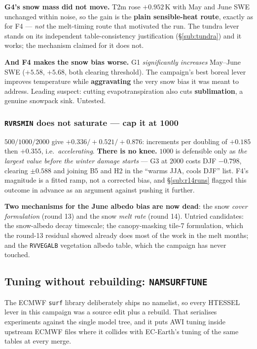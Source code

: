 \documentclass[10pt]{article}
\begin{document}
\noindent \textbf{G4's snow mass did not move.} T2m rose $+0.952$\,K with May and June SWE
unchanged within noise, so the gain is the \textbf{plain sensible-heat route}, exactly as for
F4 --- \emph{not} the melt-timing route that motivated the run. The tundra lever stands on its
independent table-consistency justification (\S\ref{sub:tundra}) and it works; the mechanism
claimed for it does not.

\noindent \textbf{And F4 makes the snow bias worse.} G1 \emph{significantly increases}
May--June SWE ($+5.58$, $+5.68$, both clearing threshold). The campaign's best boreal lever
improves temperature while \textbf{aggravating} the very snow bias it was meant to address.
Leading suspect: cutting evapotranspiration also cuts \textbf{sublimation}, a genuine
snowpack sink. Untested.

\subsubsection*{\texttt{RVRSMIN} does not saturate --- cap it at 1000}
$500/1000/2000$ give $+0.336/+0.521/+0.876$: increments per doubling of $+0.185$ then
$\mathbf{+0.355}$, i.e.\ \emph{accelerating}. \textbf{There is no knee.} $1000$ is defensible
only as \emph{the largest value before the winter damage starts} --- G3 at $2000$ costs
DJF $-0.798$, clearing $\pm0.588$ and joining B5 and H2 in the ``warms JJA, cools DJF'' list.
F4's magnitude is a fitted ramp, not a corrected bias, and \S\ref{sub:r14runs} flagged this
outcome in advance as an argument against pushing it further.

\noindent \textbf{Two mechanisms for the June albedo bias are now dead}: the snow
\emph{cover formulation} (round 13) and the snow \emph{melt rate} (round 14). Untried
candidates: the snow-albedo decay timescale; the canopy-masking tile-7 formulation, which the
round-13 residual showed already does most of the work in the melt months; and the
\texttt{RVVEGALB} vegetation albedo table, which the campaign has never touched.

\subsection{Tuning without rebuilding: \texttt{NAMSURFTUNE}}\label{sub:nmltune}
The ECMWF \texttt{surf} library deliberately ships no namelist, so every HTESSEL lever in this
campaign was a source edit plus a rebuild. That serialises experiments against the single
model tree, and it puts AWI tuning inside upstream ECMWF files where it collides with
EC-Earth's tuning of the same tables at every merge.
\end{document}
